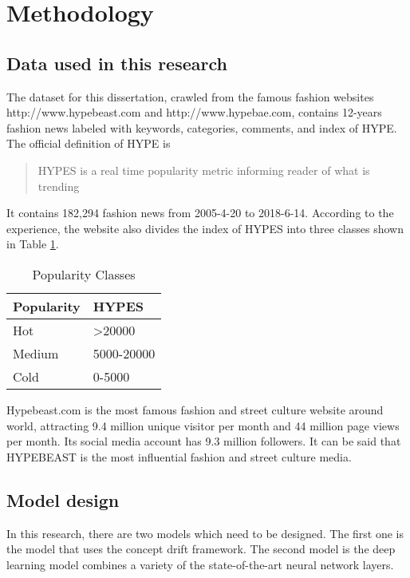 \section{Methodology}
\subsection{Data used in this research}
The dataset for this dissertation, crawled from the famous fashion websites http://www.hypebeast.com and http://www.hypebae.com, contains 12-years fashion news labeled with keywords, categories, comments, and index of HYPE. The official definition of HYPE is 

\begin{quote}
HYPES is a real time popularity metric informing reader of what is trending
\end{quote}

It contains 182,294 fashion news from 2005-4-20 to 2018-6-14. According to the experience, the website also divides the index of HYPES into three classes shown in Table \ref{popularityclasses}.

\begin{table}[]
\label{popularityclasses}
\centering
\caption{Popularity Classes}
\begin{tabular}{ll}
\hline
Popularity & HYPES               \\ \hline
Hot        & \textgreater{}20000 \\
Medium     & 5000-20000          \\
Cold       & 0-5000 \\
\hline             
\end{tabular}
\end{table}

Hypebeast.com is the most famous fashion and street culture website around world, attracting 9.4 million unique visitor per month and 44 million page views per month. Its social media account has 9.3 million followers. It can be said that HYPEBEAST is the most influential fashion and street culture media.


\subsection{Model design}
In this research, there are two models which need to be designed. The first one is the model that uses the concept drift framework. The second model is the deep learning model combines a variety of the state-of-the-art neural network layers.


